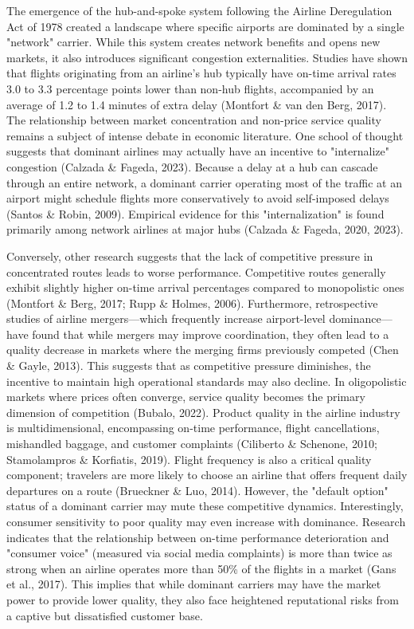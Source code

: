 \documentclass[preprint,12pt,authoryear]{elsarticle}
\begin{document}
The emergence of the hub-and-spoke system following the Airline Deregulation Act of 1978 created a landscape where specific airports are dominated by a single "network" carrier. While this system creates network benefits and opens new markets, it also introduces significant congestion externalities. Studies have shown that flights originating from an airline’s hub typically have on-time arrival rates 3.0 to 3.3 percentage points lower than non-hub flights, accompanied by an average of 1.2 to 1.4 minutes of extra delay (Montfort \& van den Berg, 2017). The relationship between market concentration and non-price service quality remains a subject of intense debate in economic literature. One school of thought suggests that dominant airlines may actually have an incentive to "internalize" congestion (Calzada \& Fageda, 2023). Because a delay at a hub can cascade through an entire network, a dominant carrier operating most of the traffic at an airport might schedule flights more conservatively to avoid self-imposed delays (Santos \& Robin, 2009). Empirical evidence for this "internalization" is found primarily among network airlines at major hubs (Calzada \& Fageda, 2020, 2023).


Conversely, other research suggests that the lack of competitive pressure in concentrated routes leads to worse performance. Competitive routes generally exhibit slightly higher on-time arrival percentages compared to monopolistic ones (Montfort \& Berg, 2017; Rupp \& Holmes, 2006). Furthermore, retrospective studies of airline mergers—which frequently increase airport-level dominance—have found that while mergers may improve coordination, they often lead to a quality decrease in markets where the merging firms previously competed (Chen \& Gayle, 2013). This suggests that as competitive pressure diminishes, the incentive to maintain high operational standards may also decline.
In oligopolistic markets where prices often converge, service quality becomes the primary dimension of competition (Bubalo, 2022). Product quality in the airline industry is multidimensional, encompassing on-time performance, flight cancellations, mishandled baggage, and customer complaints (Ciliberto \& Schenone, 2010; Stamolampros \& Korfiatis, 2019). Flight frequency is also a critical quality component; travelers are more likely to choose an airline that offers frequent daily departures on a route (Brueckner \& Luo, 2014).
However, the "default option" status of a dominant carrier may mute these competitive dynamics. Interestingly, consumer sensitivity to poor quality may even increase with dominance. Research indicates that the relationship between on-time performance deterioration and "consumer voice" (measured via social media complaints) is more than twice as strong when an airline operates more than 50\% of the flights in a market (Gans et al., 2017). This implies that while dominant carriers may have the market power to provide lower quality, they also face heightened reputational risks from a captive but dissatisfied customer base.
\end{document}
